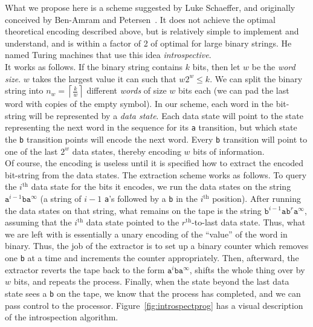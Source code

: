 \documentclass[11pt]{article}
\begin{document}
What we propose here is a scheme suggested by Luke Schaeffer, and originally conceived by Ben-Amram and Petersen~\cite{benamram}. It does not achieve the optimal theoretical encoding described above, but is relatively simple to implement and understand, and is within a factor of 2 of optimal for large binary strings. He named Turing machines that use this idea \emph{introspective}.  \\

It works as follows. If the binary string contains $k$ bits, then let $w$ be the \emph{word size}. $w$ takes the largest value it can such that $w2^w \le k$. We can split the binary string into $n_w = \left \lceil{\frac{k}{w}}\right \rceil$ different \emph{words} of size $w$ bits each (we can pad the last word with copies of the empty symbol). In our scheme, each word in the bit-string will be represented by a \emph{data state}. Each data state will point to the state representing the next word in the sequence for its \texttt{a} transition, but which state the \texttt{b} transition points will encode the next word. Every \texttt{b} transition will point to one of the last $2^w$ data states, thereby encoding $w$ bits of information. \\

Of course, the encoding is useless until it is specified how to extract the encoded bit-string from the data states. The extraction scheme works as follows. To query the $i^\textrm{th}$ data state for the bits it encodes, we run the data states on the string $\texttt{a}^{i-1}\texttt{b}\texttt{a}^{\infty}$ (a string of $i-1$ \texttt{a}'s followed by a \texttt{b} in the $i^\textrm{th}$ position). After running the data states on that string, what remains on the tape is the string $\texttt{b}^{i-1}\texttt{a}\texttt{b}^r\texttt{a}^{\infty}$, assuming that the $i^\textrm{th}$ data state pointed to the $r^\textrm{th}$-to-last data state. Thus, what we are left with is essentially a unary encoding of the ``value'' of the word in binary. Thus, the job of the extractor is to set up a binary counter which removes one \texttt{b} at a time and increments the counter appropriately. Then, afterward, the extractor reverts the tape back to the form $\texttt{a}^i\texttt{b}\texttt{a}^{\infty}$, shifts the whole thing over by $w$ bits, and repeats the process. Finally, when the state beyond the last data state sees a \texttt{b} on the tape, we know that the process has completed, and we can pass control to the processor. Figure~\ref{fig:introspectprog} has a visual description of the introspection algorithm.
\end{document}
